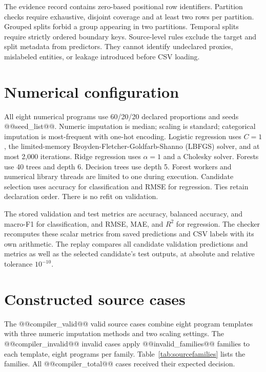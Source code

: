\documentclass[11pt,letterpaper]{article}
\begin{document}
The evidence record contains zero-based positional row identifiers. Partition checks require exhaustive, disjoint coverage and at least two rows per partition. Grouped splits forbid a group appearing in two partitions. Temporal splits require strictly ordered boundary keys. Source-level rules exclude the target and split metadata from predictors. They cannot identify undeclared proxies, mislabeled entities, or leakage introduced before CSV loading.

\section{Numerical configuration}
All eight numerical programs use 60/20/20 declared proportions and seeds @@seed_list@@. Numeric imputation is median; scaling is standard; categorical imputation is most-frequent with one-hot encoding. Logistic regression uses $C=1$, the limited-memory Broyden-Fletcher-Goldfarb-Shanno (LBFGS) solver, and at most 2,000 iterations. Ridge regression uses $\alpha=1$ and a Cholesky solver. Forests use 40 trees and depth 6. Decision trees use depth 5. Forest workers and numerical library threads are limited to one during execution. Candidate selection uses accuracy for classification and RMSE for regression. Ties retain declaration order. There is no refit on validation.

The stored validation and test metrics are accuracy, balanced accuracy, and macro-F1 for classification, and RMSE, MAE, and $R^2$ for regression. The checker recomputes these scalar metrics from saved predictions and CSV labels with its own arithmetic. The replay compares all candidate validation predictions and metrics as well as the selected candidate's test outputs, at absolute and relative tolerance $10^{-10}$.

\section{Constructed source cases}
The @@compiler_valid@@ valid source cases combine eight program templates with three numeric imputation methods and two scaling settings. The @@compiler_invalid@@ invalid cases apply @@invalid_families@@ families to each template, eight programs per family. Table~\ref{tab:sourcefamilies} lists the families. All @@compiler_total@@ cases received their expected decision.
\end{document}
